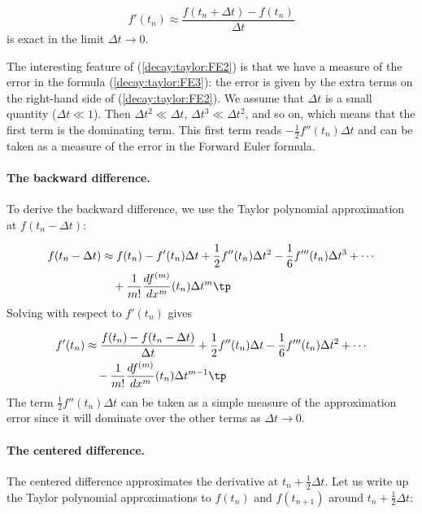 \documentclass[graybox,sectrefs,envcountresetchap,open=right,final]{svmonodo}
\begin{document}
\begin{equation}
f'(t_n) \approx \frac{f(t_n+\Delta t) - f(t_n)}{\Delta t}
\label{decay:taylor:FE3}
\end{equation}
is exact in the limit $\Delta t\rightarrow 0$.

The interesting feature of (\ref{decay:taylor:FE2}) is that we have
a measure of the error in the formula (\ref{decay:taylor:FE3}): the
error is given by the extra terms on the right-hand side of
(\ref{decay:taylor:FE2}). We assume that $\Delta t$ is a small quantity
($\Delta t\ll 1$).
Then $\Delta t^2\ll\Delta t$, $\Delta t^3\ll \Delta t^2$, and so on,
which means that the first term is the dominating term. This first
term reads $-\frac{1}{2}f''(t_n)\Delta t$ and can be taken as a
measure of the error in the Forward Euler formula.

\paragraph{The backward difference.}
To derive the backward difference, we use the Taylor polynomial
approximation at $f(t_n-\Delta t)$:

\begin{align}
f(t_n-\Delta t) &\approx f(t_n) - f'(t_n)\Delta t + \frac{1}{2}f''(t_n)
\Delta t^2 -
\frac{1}{6}f'''(t_n)\Delta t^3+ \cdots\nonumber\\ 
&\quad + \frac{1}{m!}\frac{df^{(m)}}{dx^m}(t_n)\Delta t^m\tp
\label{decay:taylor:BE1}
\end{align}
Solving with respect to $f'(t_n)$ gives

\begin{align}
f'(t_n) &\approx \frac{f(t_n) - f(t_n-\Delta t)}{\Delta t}
+ \frac{1}{2}f''(t_n)\Delta t -
\frac{1}{6}f'''(t_n)\Delta t^2+ \cdots\nonumber\\ 
&\quad - \frac{1}{m!}\frac{df^{(m)}}{dx^m}(t_n)\Delta t^{m-1}\tp
\label{decay:taylor:BE2}
\end{align}
The term $\frac{1}{2}f''(t_n)\Delta t$ can be taken as a simple measure of
the approximation error since it will dominate over the other terms
as $\Delta t\rightarrow 0$.

\paragraph{The centered difference.}
The centered difference approximates the derivative at
$t_n+\frac{1}{2}\Delta t$. Let us write up the Taylor polynomial
approximations to $f(t_n)$ and $f(t_{n+1})$ around $t_n+\frac{1}{2}\Delta t$:
\end{document}
